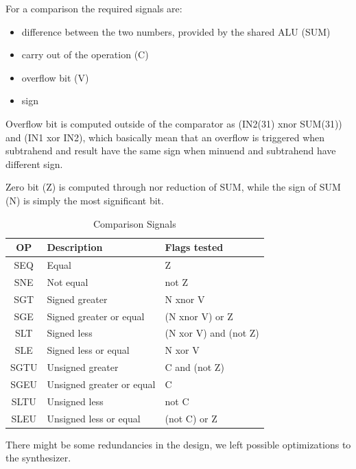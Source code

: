 \documentclass[12pt]{article}
\begin{document}
For a comparison the required signals are:
\begin{itemize}
	\item difference between the two numbers, provided by the shared ALU (SUM)
	\item carry out of the operation (C)
	\item overflow bit (V)
	\item sign
\end{itemize}
Overflow bit is computed outside of the comparator as (IN2(31) xnor SUM(31)) and (IN1 xor IN2),
which basically mean that an overflow is triggered when subtrahend and result have the same sign when minuend and subtrahend have different sign.

Zero bit (Z) is computed through nor reduction of SUM, while the sign of SUM (N) is simply the most significant bit.
\begin{table}
\begin{center}
	\begin{tabular}{ | c | l | l |}
		\hline
		\rowcolor{LimeGreen} OP & Description & Flags tested \\ \hline
		SEQ & Equal & Z \\ \hline
		SNE & Not equal &  not Z \\ \hline
		SGT & Signed greater & N xnor V \\ \hline
		SGE & Signed greater or equal & (N  xnor  V) or Z \\ \hline
		SLT & Signed less & (N xor V) and (not Z)\\ \hline
		SLE & Signed less or equal & N xor V \\ \hline
		SGTU & Unsigned greater & C and (not Z) \\ \hline
		SGEU & Unsigned greater or equal & C \\ \hline
		SLTU & Unsigned less & not C \\ \hline
		SLEU & Unsigned less or equal & (not C) or Z  \\ \hline
	\end{tabular}
		\caption{Comparison Signals}
		\label{COMPA}
\end{center}
\end{table}

There might be some redundancies in the design, we left possible optimizations to the synthesizer.
\end{document}
